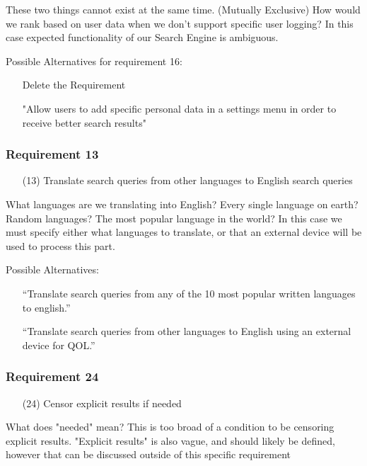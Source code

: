 These two things cannot exist at the same time. (Mutually Exclusive)
How would we rank based on user data when we don't support specific user logging? In this case expected functionality of our Search Engine is ambiguous.

\medskip

Possible Alternatives for requirement 16:
\begin{itemize}
  \item[] Delete the Requirement
  \item[] "Allow users to add specific personal data in a settings menu in order to receive better search results"
\end{itemize}

\subsubsection*{Requirement 13}
\begin{itemize}
  \item[(13)] Translate search queries from other languages to English search queries
\end{itemize}

What languages are we translating into English? Every single language on earth? Random languages? The most popular language in the world? In this case we must specify either what languages to translate, or that an external device will be used to process this part.

\medskip

Possible Alternatives:
\begin{itemize}
  \item[] “Translate search queries from any of the 10 most popular written languages to english.”
  \item[] “Translate search queries from other languages to English using an external device for QOL.”
\end{itemize}

\subsubsection*{Requirement 24}
\begin{itemize}
  \item[(24)] Censor explicit results if needed
\end{itemize}

What does "needed" mean? This is too broad of a condition to be censoring explicit results. "Explicit results" is also vague, and should likely be defined, however that can be discussed outside of this specific requirement

